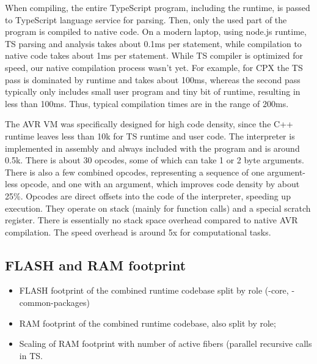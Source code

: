 When compiling, the entire TypeScript program, including the runtime, is
passed to TypeScript language service for parsing. Then, only the used
part of the program is compiled to native code.
On a modern laptop, using node.js runtime, TS parsing and analysis takes about 0.1ms per statement,
while compilation to native code takes about 1ms per statement.
While TS compiler is optimized for speed, our native compilation process wasn't yet.
For example, for CPX the TS pass is dominated by runtime and takes about 100ms,
whereas the second pass typically only includes small user program
and tiny bit of runtime, resulting in less than 100ms. Thus, typical compilation
times are in the range of 200ms.

The AVR VM was specifically designed for high code density, since the C++ runtime
leaves less than 10k for TS runtime and user code.
The interpreter is implemented in assembly and always included with the program and is around 0.5k.
There is about 30 opcodes, some of which can take 1 or 2 byte arguments. 
There is also a few combined opcodes, representing a sequence of one argument-less opcode,
and one with an argument, which improves code density by about 25\%.
Opcodes are direct offsets into the code of the interpreter, speeding up execution.
They operate on stack (mainly for function calls) and a special scratch register.
There is essentially no stack space overhead compared to native AVR compilation.
The speed overhead is around 5x for computational tasks.




\subsection{FLASH and RAM footprint}

\begin{itemize}

\item FLASH footprint of the combined runtime codebase split by role (\CON-core, \MCN-common-packages)
\item RAM footprint of the combined runtime codebase, also split by role; 
\item Scaling of RAM footprint with number of active fibers (parallel recursive calls in TS. 
\end{itemize}

